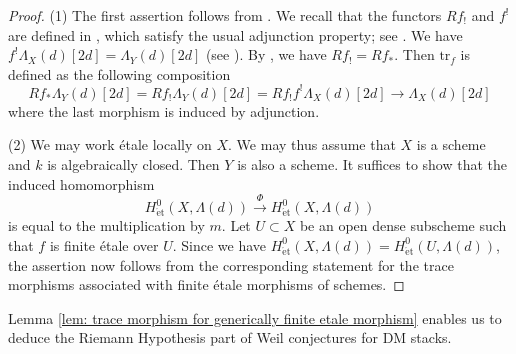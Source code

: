 \documentclass{amsart}
\theoremstyle{definition}
\theoremstyle{remark}
\newcommand{\et}{\operatorname{\acute{e}t}}%
\begin{document}
\begin{proof}
    (1) The first assertion follows from \cite[Corollary 4.6.2]{Laszlo-Olsson}.
    We recall that the functors $Rf_!$ and $f^!$ are defined in \cite[Definition 4.4.1]{Laszlo-Olsson}, which satisfy the usual adjunction property; see \cite[Proposition 4.4.2]{Laszlo-Olsson}.
    We have $f^!\Lambda_X(d)[2d] = \Lambda_Y(d)[2d]$ (see \cite[(4.4.i)]{Laszlo-Olsson}).
    By \cite[Proposition 5.2.1]{Laszlo-Olsson}, we have
    $
    Rf_!=Rf_*.
    $
    Then $\mathrm{tr}_f$ is defined as the following composition
    \[
    R f_* \Lambda_Y(d)[2d] = Rf_!\Lambda_Y(d)[2d] = Rf_!f^!\Lambda_X(d)[2d] \to \Lambda_X(d)[2d]
    \]
    where the last morphism is induced by adjunction.

    (2) We may work \'etale locally on $X$.
    We may thus assume that $X$ is a scheme and $k$ is algebraically closed.
    Then $Y$ is also a scheme.
    It suffices to show that
    the induced homomorphism
    \[
    H^0_{\et}(X, \Lambda(d)) \overset{\Phi}{\to} H^0_{\et}(X, \Lambda(d))
    \]
    is equal to the multiplication by $m$.
    Let $U \subset X$ be an open dense subscheme such that $f$ is finite \'etale over $U$.
    Since we have
    $H^0_{\et}(X, \Lambda(d))=H^0_{\et}(U, \Lambda(d))$,
    the assertion now follows from the corresponding statement for the trace morphisms associated with finite \'etale morphisms of schemes.
\end{proof}

Lemma \ref{lem: trace morphism for generically finite etale morphism} enables us to deduce the Riemann Hypothesis part of Weil conjectures for DM stacks.
\end{document}
